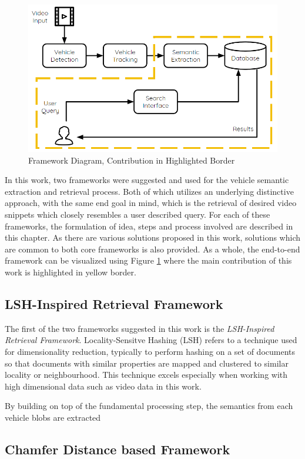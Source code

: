 \begin{figure}[hbt!]\centering
\includegraphics[width=.9\textwidth]{image/framework_new.PNG}
\caption{Framework Diagram, Contribution in Highlighted Border}
\label{fig:framework}
\end{figure}


In this work, two frameworks were suggested and used for the vehicle semantic extraction and retrieval process. Both of which utilizes an underlying distinctive approach, with the same end goal in mind, which is the retrieval of desired video snippets which closely resembles a user described query. For each of these frameworks, the formulation of idea, steps and process involved are described in this chapter. As there are various solutions proposed in this work, solutions which are common to both core frameworks is also provided. As a whole, the end-to-end framework can be visualized using Figure \ref{fig:framework} where the main contribution of this work is highlighted in yellow border. 

\subsection{LSH-Inspired Retrieval Framework}
The first of the two frameworks suggested in this work is the \textit{LSH-Inspired Retrieval Framework}. Locality-Sensitve Hashing (LSH) refers to a technique used for dimensionality reduction, typically to perform hashing on a set of documents so that documents with similar properties are mapped and clustered to similar locality or neighbourhood. This technique excels especially when working with high dimensional data such as video data in this work.

By building on top of the fundamental processing step, the semantics from each vehicle blobs are extracted

\subsection{Chamfer Distance based Framework}




